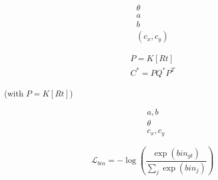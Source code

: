 \begin{equation}
\begin{split}
    \theta\\
    a\\
    b\\
    (c_x, c_y)
    \end{split}
\end{equation}


\begin{equation}
    \begin{split}
         P = K[Rt] \\
        C^* = P Q^* P^T
    \end{split}
\end{equation}

(with $P = K[Rt]$)

\begin{equation}
    \begin{split}
         &a, b \\
         &\theta \\
         &c_x, c_y
    \end{split}
\end{equation}


\begin{equation}
    \mathcal{L}_{bin} = -\log \left(\frac{\exp(bin_{gt})}{\sum_j \exp(bin_j)}\right)
\end{equation}